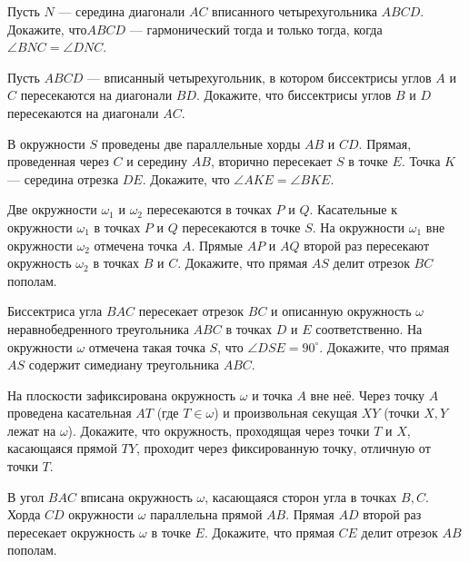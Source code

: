 \documentclass{article}
\begin{document}
\begin{enumerate_boxed}
        \item Пусть $N$ — середина диагонали $AC$ вписанного четырехугольника $ABCD$.
        Докажите, что$ABCD$ — гармонический тогда и только тогда, когда $\angle BNC = \angle DNC$.

        \item Пусть $ABCD$ — вписанный четырехугольник, в котором биссектрисы углов $A$ и $C$ пересекаются на диагонали $BD$.
        Докажите, что биссектрисы углов $B$ и $D$ пересекаются на диагонали $AC$.


        \item В окружности $S$ проведены две параллельные хорды $AB$ и $CD$.
        Прямая, проведенная через $C$ и середину $AB$, вторично пересекает $S$ в точке $E$.
        Точка $K$ — середина отрезка $DE$.
        Докажите, что $\angle AKE = \angle BKE.$

        \item Две окружности $\omega_1$ и $\omega_2$ пересекаются в точках $P$ и $Q$.
        Касательные к окружности $\omega_1$ в точках $P$ и $Q$ пересекаются в точке $S$.
        На окружности $\omega_1$ вне окружности $\omega_2$ отмечена точка $A$.
        Прямые $AP$ и $AQ$ второй раз пересекают окружность $\omega_2$ в точках $B$ и $C$.
        Докажите, что прямая $AS$ делит отрезок $BC$ пополам.

        \item Биссектриса угла $BAC$ пересекает отрезок $BC$ и описанную окружность $\omega$ неравнобедренного треугольника $ABC$ в точках $D$ и $E$ соответственно.
        На окружности $\omega$ отмечена такая точка $S$, что $\angle DSE = 90^\circ$.
        Докажите, что прямая $AS$ содержит симедиану треугольника $ABC$.

        \item На плоскости зафиксирована окружность $\omega$ и точка $A$ вне неё.
        Через точку $A$
        проведена касательная $AT$ (где $T \in \omega$) и произвольная секущая $XY$ (точки $X, Y$
        лежат на $\omega$). Докажите, что окружность, проходящая через точки $T$ и $X$, касающаяся прямой $TY$, проходит через фиксированную точку, отличную от точки $T$.

        \item В угол $BAC$ вписана окружность $\omega$, касающаяся сторон угла в точках $B, C$.
        Хорда $CD$ окружности $\omega$ параллельна прямой $AB$.
        Прямая $AD$ второй раз пересекает окружность $\omega$ в точке $E$.
        Докажите, что прямая $CE$ делит отрезок $AB$ пополам.


\end{enumerate_boxed}
\end{document}
